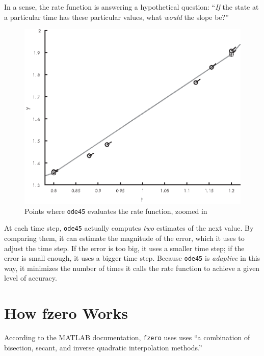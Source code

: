In a sense, the rate function is answering a hypothetical question: ``{\em If} the state at a particular time has these particular values, what {\em would} the slope be?''

\begin{figure}
\centerline{\includegraphics{book/images/figure15_02_new.eps}}
\caption{Points where \lstinline{ode45} evaluates the rate function, zoomed in}
\label{fig:odeplot2}
\end{figure}

At each time step, \lstinline{ode45} actually computes {\em two} estimates of the next value.
By comparing them, it can estimate the magnitude of the error, which it uses to adjust the time step.
If the error is too big, it uses a smaller time step; if the error is small enough, it uses a bigger time step.
Because \lstinline{ode45} is \emph{adaptive} in this way, it minimizes the number of times it calls the rate function to achieve a given level of accuracy.



\section{How fzero Works}
\label{howfzero}

According to the MATLAB documentation, \lstinline{fzero} uses uses ``a combination of bisection, secant, and inverse quadratic interpolation methods.''


